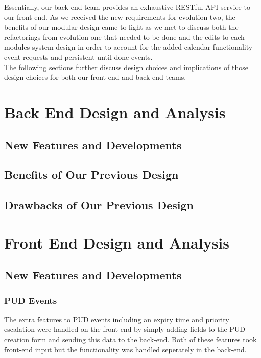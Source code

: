 \documentclass[11pt]{article}   %
\begin{document}
\noindent Essentially, our back end team provides an exhaustive RESTful API service to our front end. As we received the new requirements for evolution two, the benefits of our modular design came to light as we met to discuss both the refactorings from evolution one that needed to be done and the edits to each modules system design in order to account for the added calendar functionality--event requests and persistent until done events.\\

\noindent The following sections further discuss design choices and implications of those design choices for both our front end and back end teams. \\

\section{Back End Design and Analysis}
\subsection{New Features and Developments}
\subsection{Benefits of Our Previous Design}
\subsection{Drawbacks of Our Previous Design}

\section{Front End Design and Analysis}

\subsection{New Features and Developments}

\subsubsection{PUD Events}

The extra features to PUD events including an expiry time and priority escalation were handled on the front-end by simply adding fields to the PUD creation form and sending this data to the back-end. Both of these features  took front-end input but the functionality was handled seperately in the back-end.
\end{document}
